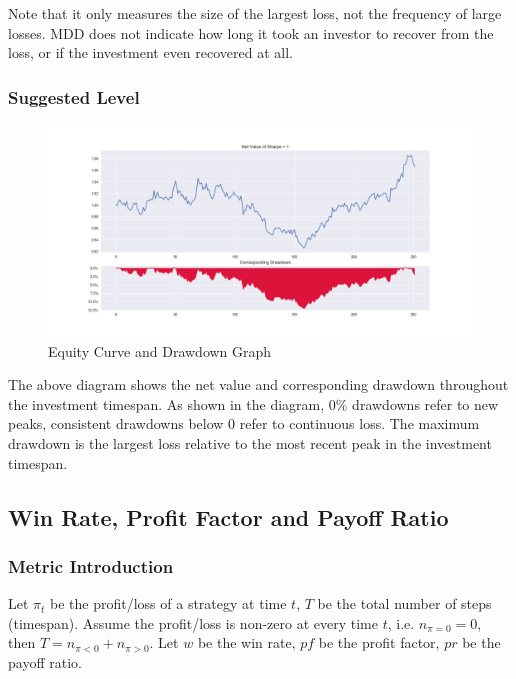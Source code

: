 \documentclass[12pt]{article}
\begin{document}
Note that it only measures the size of the largest loss, not the frequency of large losses. MDD does not indicate how long it took an investor to recover from the loss, or if the investment even recovered at all.

\subsubsection*{Suggested Level}

\begin{figure}[h!]
  \centering
  \includegraphics[scale=0.39]{./ref/figure/drawdown_nav_600.png}
  \caption{Equity Curve and Drawdown Graph}
  \label{fig:drawdown}
\end{figure}

The above diagram shows the net value and corresponding drawdown throughout the investment timespan. As shown in the diagram, \(0\%\) drawdowns refer to new peaks, consistent drawdowns below 0 refer to continuous loss. The maximum drawdown is the largest loss relative to the most recent peak in the investment timespan.

\subsection{Win Rate, Profit Factor and Payoff Ratio}

\subsubsection*{Metric Introduction}

Let \(\pi_t\) be the profit/loss of a strategy at time \(t\), \(T\) be the total number of steps (timespan). Assume the profit/loss is non-zero at every time \(t\), i.e. \(n_{\pi=0} = 0\), then \(T = n_{\pi<0} + n_{\pi>0}\). Let \(w\) be the win rate, \(pf\) be the profit factor, \(pr\) be the payoff ratio.
\end{document}
